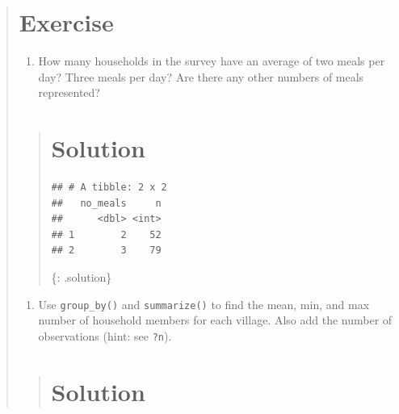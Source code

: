 \documentclass[]{book}
\newenvironment{Shaded}{\begin{snugshade}}{\end{snugshade}}
\newcommand{\KeywordTok}[1]{\textcolor[rgb]{0.13,0.29,0.53}{\textbf{#1}}}
\newcommand{\DataTypeTok}[1]{\textcolor[rgb]{0.13,0.29,0.53}{#1}}
\newcommand{\StringTok}[1]{\textcolor[rgb]{0.31,0.60,0.02}{#1}}
\newcommand{\OperatorTok}[1]{\textcolor[rgb]{0.81,0.36,0.00}{\textbf{#1}}}
\newcommand{\NormalTok}[1]{#1}
\providecommand{\tightlist}{%
  \setlength{\itemsep}{0pt}\setlength{\parskip}{0pt}}
\begin{document}
\begin{quote}
\section{Exercise}\label{exercise-10}

\begin{enumerate}
\def\labelenumi{\arabic{enumi}.}
\tightlist
\item
  How many households in the survey have an average of two meals per
  day? Three meals per day? Are there any other numbers of meals
  represented?
\end{enumerate}

\begin{quote}
\section{Solution}\label{solution-11}

\begin{Shaded}
\end{Shaded}

\begin{verbatim}
## # A tibble: 2 x 2
##   no_meals     n
##      <dbl> <int>
## 1        2    52
## 2        3    79
\end{verbatim}

\{: .solution\}
\end{quote}

\begin{enumerate}
\def\labelenumi{\arabic{enumi}.}
\setcounter{enumi}{1}
\tightlist
\item
  Use \texttt{group\_by()} and \texttt{summarize()} to find the mean,
  min, and max number of household members for each village. Also add
  the number of observations (hint: see \texttt{?n}).
\end{enumerate}

\begin{quote}
\section{Solution}\label{solution-12}

\begin{Shaded}
\end{Shaded}


\end{quote}
\end{quote}
\end{document}
